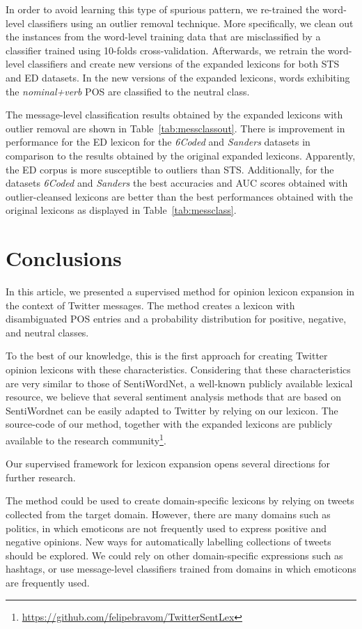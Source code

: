 \documentclass{sig-alternate}
\begin{document}
In order to avoid learning this type of spurious pattern, we re-trained the word-level classifiers using an outlier removal technique. More specifically, we clean out the instances from the word-level training data that are misclassified by a classifier trained using 10-folds cross-validation. Afterwards, we retrain the word-level classifiers and create new versions of the expanded lexicons for both STS and ED datasets. In the new versions of the expanded lexicons, words exhibiting the \emph{nominal+verb} POS are classified to the neutral class.

The message-level classification results obtained by the expanded lexicons with outlier removal are shown in Table~\ref{tab:messclassout}. There is improvement in performance for the ED lexicon for the \emph{6Coded} and \emph{Sanders} datasets in comparison to the results obtained by the original expanded lexicons. Apparently, the ED corpus is more susceptible to outliers than STS. Additionally, for the datasets \emph{6Coded} and \emph{Sanders} the best accuracies and AUC scores obtained with outlier-cleansed lexicons are better than the best performances obtained with the original lexicons as displayed in Table~\ref{tab:messclass}.


\section{Conclusions}\label{sec:conc}

In this article, we presented a supervised method for opinion lexicon expansion in the context of Twitter messages. The method creates a lexicon with disambiguated POS entries and a probability distribution for positive, negative, and neutral classes. 

To the best of our knowledge, this is the first approach for creating Twitter opinion lexicons with these characteristics. Considering that these characteristics are very similar to those of SentiWordNet, a well-known publicly available lexical resource, we believe that several sentiment analysis methods that are based on SentiWordnet can be easily adapted to Twitter by relying on our lexicon. The source-code of our method, together with  the expanded lexicons are publicly available to the research community\footnote{\url{https://github.com/felipebravom/TwitterSentLex}}.

Our supervised framework for lexicon expansion opens several directions for further research. 

The method could be used to create domain-specific lexicons by relying on tweets collected from the target domain. However, there are many domains such as politics, in which emoticons are not frequently used to express positive and negative opinions. New ways for automatically labelling collections of tweets should be explored. We could rely on other domain-specific expressions such as hashtags, or use message-level classifiers trained from domains in which emoticons are frequently used. 
\end{document}
